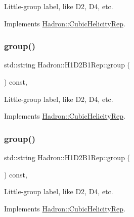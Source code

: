 Little-\/group label, like D2, D4, etc. 

Implements \mbox{\hyperlink{structHadron_1_1CubicHelicityRep_a101a7d76cd8ccdad0f272db44b766113}{Hadron\+::\+Cubic\+Helicity\+Rep}}.

\mbox{\label{structHadron_1_1H1D2B1Rep_a18b7522e1d6bfeeb4abf011f7e6def9a}} 
\subsubsection{\texorpdfstring{group()}{group()}\hspace{0.1cm}{\footnotesize\ttfamily [3/5]}}
{\footnotesize\ttfamily std\+::string Hadron\+::\+H1\+D2\+B1\+Rep\+::group (\begin{DoxyParamCaption}{ }\end{DoxyParamCaption}) const\hspace{0.3cm}{\ttfamily [inline]}, {\ttfamily [virtual]}}

Little-\/group label, like D2, D4, etc. 

Implements \mbox{\hyperlink{structHadron_1_1CubicHelicityRep_a101a7d76cd8ccdad0f272db44b766113}{Hadron\+::\+Cubic\+Helicity\+Rep}}.

\mbox{\label{structHadron_1_1H1D2B1Rep_a18b7522e1d6bfeeb4abf011f7e6def9a}} 
\subsubsection{\texorpdfstring{group()}{group()}\hspace{0.1cm}{\footnotesize\ttfamily [4/5]}}
{\footnotesize\ttfamily std\+::string Hadron\+::\+H1\+D2\+B1\+Rep\+::group (\begin{DoxyParamCaption}{ }\end{DoxyParamCaption}) const\hspace{0.3cm}{\ttfamily [inline]}, {\ttfamily [virtual]}}

Little-\/group label, like D2, D4, etc. 

Implements \mbox{\hyperlink{structHadron_1_1CubicHelicityRep_a101a7d76cd8ccdad0f272db44b766113}{Hadron\+::\+Cubic\+Helicity\+Rep}}.

\mbox{\label{structHadron_1_1H1D2B1Rep_a18b7522e1d6bfeeb4abf011f7e6def9a}} 
